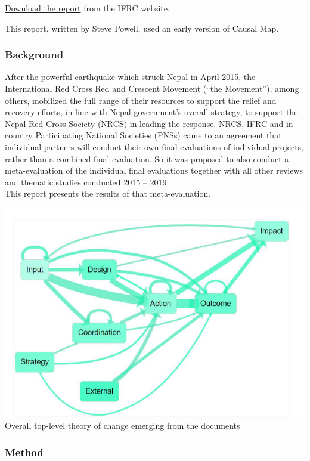 \documentclass[
]{book}
\begin{document}
\href{https://www.ifrc.org/media/13554}{Download the report} from the IFRC website.

This report, written by Steve Powell, used an early version of Causal Map.

\hypertarget{background}{%
\subsubsection{Background}\label{background}}

After the powerful earthquake which struck Nepal in April 2015, the International Red Cross Red and Crescent Movement (``the Movement''), among others, mobilized the full range of their resources to support the relief and recovery efforts, in line with Nepal government's overall strategy, to support the Nepal Red Cross Society (NRCS) in leading the response. NRCS, IFRC and in-country Participating National Societies (PNSs) came to an agreement that individual partners will conduct their own final evaluations of individual projects, rather than a combined final evaluation. So it was proposed to also conduct a meta-evaluation of the individual final evaluations together with all other reviews and thematic studies conducted 2015 -- 2019.\\
This report presents the results of that meta-evaluation.

\includegraphics{_assets/f184ac06895268db126fca2e3d51ed31.png}Overall top-level theory of change emerging from the documents

\hypertarget{method}{%
\subsubsection{Method}\label{method}}
\end{document}
